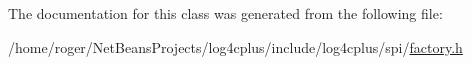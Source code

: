The documentation for this class was generated from the following file\-:\begin{DoxyCompactItemize}
\item 
/home/roger/\-Net\-Beans\-Projects/log4cplus/include/log4cplus/spi/\hyperlink{factory_8h}{factory.\-h}\end{DoxyCompactItemize}
